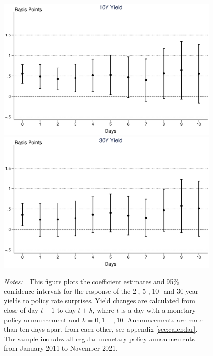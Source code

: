 \documentclass[a4paper,12pt]{article} 		%
\newcommand{\figtext}[1]{
	\vspace{-1ex}
	\captionsetup{justification=justified,font=footnotesize}
	\caption*{#1}
}
\newcommand{\fignotes}[1]{\figtext{\emph{Notes:~}~#1}}
\providecommand{\lastobsfx}{November 2021}
\providecommand{\idxh}{h}
\begin{document}
\begin{figure}[tbph]
\begin{center}
\begin{minipage}{0.9\linewidth}
\begin{center}
				\includegraphics[trim={0.5cm 0cm 0.5cm 0cm},clip,height=.2\textheight,width=1\textwidth]{../Figures/persistprsgmxn10yr.eps} \\
				\includegraphics[trim={0.5cm 0cm 0.5cm 0cm},clip,height=.2\textheight,width=1\textwidth]{../Figures/persistprsgmxn30yr.eps} \\
			\end{center}
			\fignotes{This figure plots the coefficient estimates and 95\% confidence intervals for the response of the 2-, 5-, 10- and 30-year yields to policy rate surprises. Yield changes are calculated from close of day \(t - 1\) to day \(t + \idxh\), where \(t\) is a day with a monetary policy announcement and \(\idxh = 0, 1, \ldots, 10\). Announcements are more than ten days apart from each other, see appendix \ref{sec:calendar}. The sample includes all regular monetary policy announcements from January 2011 to \lastobsfx.}
		\end{minipage}
	\end{center}
\end{figure}
\end{document}

